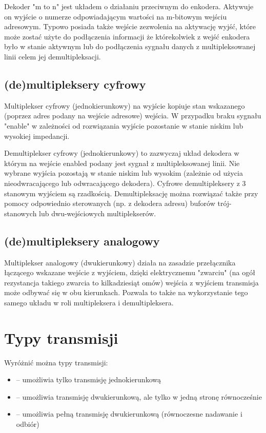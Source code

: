 \documentclass{pdfBooklets}
\begin{document}
Dekoder "m to n" jest układem o działaniu przeciwnym do enkodera. Aktywuje on wyjście o numerze odpowiadającym wartości na m-bitowym wejściu adresowym. Typowo posiada także wejście zezwolenia na aktywację wyjść, które może zostać użyte do podłączenia informacji że którekolwiek z wejść enkodera było w stanie aktywnym lub do podłączenia sygnału danych z multipleksowanej linii celem jej demultipleksacji.

\subsection{(de)multipleksery cyfrowy}

Multiplekser cyfrowy (jednokierunkowy) na wyjście kopiuje stan wskazanego (poprzez adres podany na wejście adresowe) wejścia. W przypadku braku sygnału "enable" w zależności od rozwiązania wyjście pozostanie w stanie niskim lub wysokiej impedancji.

Demultiplekser cyfrowy (jednokierunkowy) to zazwyczaj układ dekodera w którym na wejście enabled podany jest sygnał z multipleksowanej linii. Nie wybrane wyjścia pozostają w stanie niskim lub wysokim (zależnie od użycia nieodwracającego lub odwracającego dekodera). Cyfrowe demultipleksery z 3 stanowym wyjściem są rzadkością. Demultipleksację można rozwiązać także przy pomocy odpowiednio sterowanych (np. z dekodera adresu) buforów trój-stanowych lub dwu-wejściowych multiplekserów.

\subsection{(de)multipleksery analogowy}

Multiplekser analogowy (dwukierunkowy) działa na zasadzie przełącznika łączącego wskazane wejście z wyjściem, dzięki elektrycznemu "zwarciu" (na ogół rezystancja takiego zwarcia to kilkadziesiąt omów) wejścia z wyjściem transmisja może odbywać się w obu kierunkach. Pozwala to także na wykorzystanie tego samego układu w roli multipleksera i demultipleksera.


\section{Typy transmisji}

Wyróżnić można typy transmisji:
\begin{itemize}
\item {} -- umożliwia tylko transmisję jednokierunkową
\item {} -- umożliwia transmisję dwukierunkową, ale tylko w jedną stronę równocześnie
\item {} -- umożliwia pełną transmisję dwukierunkową (równoczesne nadawanie i odbiór)
\end{itemize}
\end{document}
